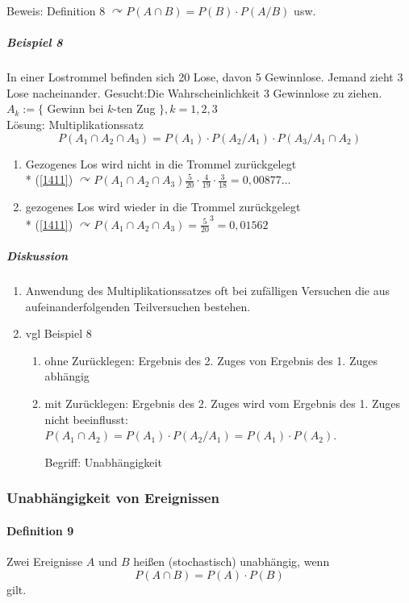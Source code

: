 \documentclass[a4paper]{scrartcl}
\begin{document}
Beweis: Definition 8 $\curvearrowright P(A \cap B ) = P (B) \cdot P(A / B)$ usw.

\subparagraph{Beispiel 8} In einer Lostrommel befinden sich 20 Lose, davon 5 Gewinnlose. Jemand zieht 3 Lose nacheinander. Gesucht:Die Wahrscheinlichkeit 3 Gewinnlose zu ziehen.\\
$A_k := \{$ Gewinn bei $k$-ten Zug $\}, k=1,2,3$\\
Lösung: Multiplikationssatz 
\begin{equation}\label{1411}
P(A_1 \cap A_2 \cap A_3) = P(A_1) \cdot P(A_2 / A_1) \cdot P(A_3 / A_1 \cap A_2)
\end{equation}
\begin{enumerate}
\item Gezogenes Los wird nicht in die Trommel zurückgelegt \\*
(\ref{1411}) $\curvearrowright P(A_1 \cap A_2 \cap A_3) \frac{5}{20} \cdot \frac{4}{19} \cdot \frac{3}{18} = 0,00877 \dots$
\item gezogenes Los wird wieder in die Trommel zurückgelegt\\*
(\ref{1411}) $\curvearrowright P(A_1 \cap A_2 \cap A_3) = \frac{5}{20}^3 = 0,01562$
\end{enumerate}

\subparagraph{Diskussion}
\begin{enumerate}
\item Anwendung des Multiplikationssatzes oft bei zufälligen Versuchen die aus aufeinanderfolgenden Teilversuchen bestehen.
\item vgl Beispiel 8
\begin{enumerate}
\item ohne Zurücklegen: Ergebnis des 2. Zuges von Ergebnis des 1. Zuges abhängig
\item mit Zurücklegen: Ergebnis des 2. Zuges wird vom Ergebnis des 1. Zuges nicht beeinflusst: $P(A_1 \cap A_2) = P(A_1) \cdot P(A_2 / A_1) = P(A_1) \cdot P(A_2)$. 

Begriff: Unabhängigkeit
\end{enumerate}
\end{enumerate}

\subsubsection{Unabhängigkeit von Ereignissen}
\paragraph{Definition 9} Zwei Ereignisse $A$ und $B$ heißen (stochastisch) unabhängig, wenn \[ P(A \cap B) = P(A) \cdot P(B)\] gilt.
\end{document}
